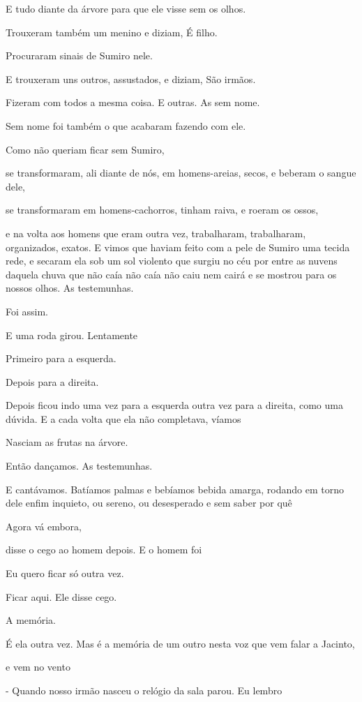 E tudo diante da árvore para que ele visse sem os olhos.

Trouxeram também um menino e diziam, É filho.

Procuraram sinais de Sumiro nele.

E trouxeram uns outros, assustados, e diziam, São irmãos.

Fizeram com todos a mesma coisa. E outras. As sem nome.

Sem nome foi também o que acabaram fazendo com ele.

Como não queriam ficar sem Sumiro,

se transformaram, ali diante de nós, em homens-areias, secos, e beberam
o sangue dele,

se transformaram em homens-cachorros, tinham raiva, e roeram os ossos,

e na volta aos homens que eram outra vez, trabalharam, trabalharam,
organizados, exatos. E vimos que haviam feito com a pele de Sumiro uma
tecida rede, e secaram ela sob um sol violento que surgiu no céu por
entre as nuvens daquela chuva que não caía não caía não caiu nem cairá e
se mostrou para os nossos olhos. As testemunhas.

Foi assim.

E uma roda girou. Lentamente

Primeiro para a esquerda.

Depois para a direita.

Depois ficou indo uma vez para a esquerda outra vez para a direita, como
uma dúvida. E a cada volta que ela não completava, víamos

Nasciam as frutas na árvore.

Então dançamos. As testemunhas.

E cantávamos. Batíamos palmas e bebíamos bebida amarga, rodando em torno
dele enfim inquieto, ou sereno, ou desesperado e sem saber por quê

Agora vá embora,

disse o cego ao homem depois. E o homem foi

Eu quero ficar só outra vez.

Ficar aqui. Ele disse cego.

A memória.

É ela outra vez. Mas é a memória de um outro nesta voz que vem falar a
Jacinto,

e vem no vento

- Quando nosso irmão nasceu o relógio da sala parou. Eu lembro

